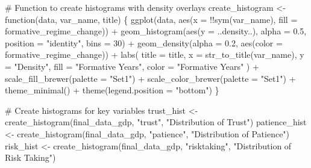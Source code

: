\documentclass[
  letterpaper,
  DIV=11,
  numbers=noendperiod]{scrartcl}
\newenvironment{Shaded}{\begin{snugshade}}{\end{snugshade}}
\newcommand{\AttributeTok}[1]{\textcolor[rgb]{0.40,0.45,0.13}{#1}}
\newcommand{\CommentTok}[1]{\textcolor[rgb]{0.37,0.37,0.37}{#1}}
\newcommand{\ControlFlowTok}[1]{\textcolor[rgb]{0.00,0.23,0.31}{#1}}
\newcommand{\DecValTok}[1]{\textcolor[rgb]{0.68,0.00,0.00}{#1}}
\newcommand{\FloatTok}[1]{\textcolor[rgb]{0.68,0.00,0.00}{#1}}
\newcommand{\FunctionTok}[1]{\textcolor[rgb]{0.28,0.35,0.67}{#1}}
\newcommand{\NormalTok}[1]{\textcolor[rgb]{0.00,0.23,0.31}{#1}}
\newcommand{\OtherTok}[1]{\textcolor[rgb]{0.00,0.23,0.31}{#1}}
\newcommand{\SpecialCharTok}[1]{\textcolor[rgb]{0.37,0.37,0.37}{#1}}
\newcommand{\StringTok}[1]{\textcolor[rgb]{0.13,0.47,0.30}{#1}}
\begin{document}
\begin{Shaded}
\begin{Highlighting}[]
\CommentTok{\# Function to create histograms with density overlays}
\NormalTok{create\_histogram }\OtherTok{\textless{}{-}} \ControlFlowTok{function}\NormalTok{(data, var\_name, title) \{}
  \FunctionTok{ggplot}\NormalTok{(data, }\FunctionTok{aes}\NormalTok{(}\AttributeTok{x =} \SpecialCharTok{!!}\FunctionTok{sym}\NormalTok{(var\_name), }\AttributeTok{fill =}\NormalTok{ formative\_regime\_change)) }\SpecialCharTok{+}
    \FunctionTok{geom\_histogram}\NormalTok{(}\FunctionTok{aes}\NormalTok{(}\AttributeTok{y =}\NormalTok{ ..density..), }\AttributeTok{alpha =} \FloatTok{0.5}\NormalTok{, }\AttributeTok{position =} \StringTok{"identity"}\NormalTok{, }\AttributeTok{bins =} \DecValTok{30}\NormalTok{) }\SpecialCharTok{+}
    \FunctionTok{geom\_density}\NormalTok{(}\AttributeTok{alpha =} \FloatTok{0.2}\NormalTok{, }\FunctionTok{aes}\NormalTok{(}\AttributeTok{color =}\NormalTok{ formative\_regime\_change)) }\SpecialCharTok{+}
    \FunctionTok{labs}\NormalTok{(}
      \AttributeTok{title =}\NormalTok{ title,}
      \AttributeTok{x =} \FunctionTok{str\_to\_title}\NormalTok{(var\_name),}
      \AttributeTok{y =} \StringTok{"Density"}\NormalTok{,}
      \AttributeTok{fill =} \StringTok{"Formative Years"}\NormalTok{,}
      \AttributeTok{color =} \StringTok{"Formative Years"}
\NormalTok{    ) }\SpecialCharTok{+}
    \FunctionTok{scale\_fill\_brewer}\NormalTok{(}\AttributeTok{palette =} \StringTok{"Set1"}\NormalTok{) }\SpecialCharTok{+}
    \FunctionTok{scale\_color\_brewer}\NormalTok{(}\AttributeTok{palette =} \StringTok{"Set1"}\NormalTok{) }\SpecialCharTok{+}
    \FunctionTok{theme\_minimal}\NormalTok{() }\SpecialCharTok{+}
    \FunctionTok{theme}\NormalTok{(}\AttributeTok{legend.position =} \StringTok{"bottom"}\NormalTok{)}
\NormalTok{\}}

\CommentTok{\# Create histograms for key variables}
\NormalTok{trust\_hist }\OtherTok{\textless{}{-}} \FunctionTok{create\_histogram}\NormalTok{(final\_data\_gdp, }\StringTok{"trust"}\NormalTok{, }\StringTok{"Distribution of Trust"}\NormalTok{)}
\NormalTok{patience\_hist }\OtherTok{\textless{}{-}} \FunctionTok{create\_histogram}\NormalTok{(final\_data\_gdp, }\StringTok{"patience"}\NormalTok{, }\StringTok{"Distribution of Patience"}\NormalTok{)}
\NormalTok{risk\_hist }\OtherTok{\textless{}{-}} \FunctionTok{create\_histogram}\NormalTok{(final\_data\_gdp, }\StringTok{"risktaking"}\NormalTok{, }\StringTok{"Distribution of Risk Taking"}\NormalTok{)}


\end{Highlighting}
\end{Shaded}
\end{document}
